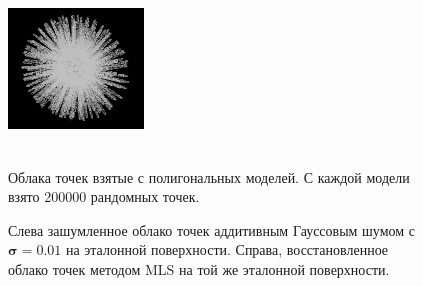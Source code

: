 \begin{figure}[h]
    \includegraphics[width=0.32\textwidth, height=5cm]{pcd/sea_urchin.png}
    \caption{Облака точек взятые с полигональных моделей. С каждой модели взято 200000 рандомных точек.}
    \label{fig:point cloud models}
\end{figure}

\begin{figure}[h]
  \centering
  \caption{Слева зашумленное облако точек аддитивным Гауссовым шумом с $\boldsymbol{\sigma = 0.01}$ на эталонной поверхности. Справа, восстановленное облако точек методом MLS на той же эталонной поверхности.}
\end{figure}

